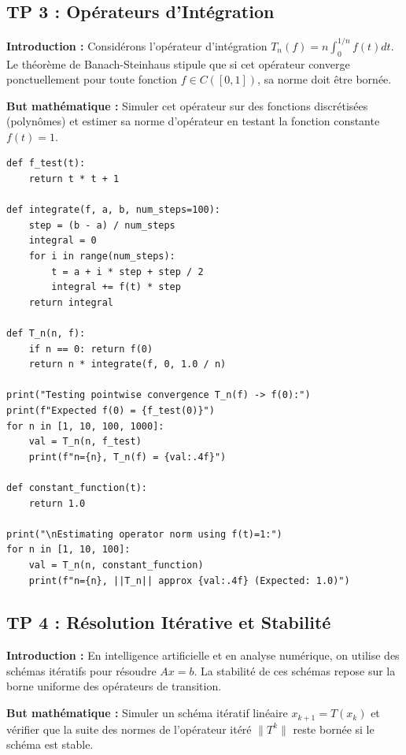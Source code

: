 \documentclass[11pt,a4paper]{article}
\begin{document}
\subsection*{TP 3 : Opérateurs d'Intégration}
\textbf{Introduction :}
Considérons l'opérateur d'intégration $T_n(f) = n \int_0^{1/n} f(t) dt$. Le théorème de Banach-Steinhaus stipule que si cet opérateur converge ponctuellement pour toute fonction $f \in C([0,1])$, sa norme doit être bornée.

\textbf{But mathématique :}
Simuler cet opérateur sur des fonctions discrétisées (polynômes) et estimer sa norme d'opérateur en testant la fonction constante $f(t) = 1$.

\begin{lstlisting}
def f_test(t):
    return t * t + 1

def integrate(f, a, b, num_steps=100):
    step = (b - a) / num_steps
    integral = 0
    for i in range(num_steps):
        t = a + i * step + step / 2
        integral += f(t) * step
    return integral

def T_n(n, f):
    if n == 0: return f(0)
    return n * integrate(f, 0, 1.0 / n)

print("Testing pointwise convergence T_n(f) -> f(0):")
print(f"Expected f(0) = {f_test(0)}")
for n in [1, 10, 100, 1000]:
    val = T_n(n, f_test)
    print(f"n={n}, T_n(f) = {val:.4f}")

def constant_function(t):
    return 1.0

print("\nEstimating operator norm using f(t)=1:")
for n in [1, 10, 100]:
    val = T_n(n, constant_function)
    print(f"n={n}, ||T_n|| approx {val:.4f} (Expected: 1.0)")
\end{lstlisting}
\vspace{1cm}
\subsection*{TP 4 : Résolution Itérative et Stabilité}
\textbf{Introduction :}
En intelligence artificielle et en analyse numérique, on utilise des schémas itératifs pour résoudre $Ax = b$. La stabilité de ces schémas repose sur la borne uniforme des opérateurs de transition.

\textbf{But mathématique :}
Simuler un schéma itératif linéaire $x_{k+1} = T(x_k)$ et vérifier que la suite des normes de l'opérateur itéré $\|T^k\|$ reste bornée si le schéma est stable.
\end{document}
